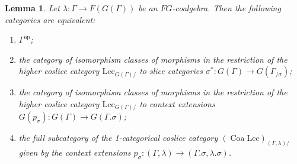 \documentclass[a4paper]{article}
\newtheorem{lemma}[theorem]{Lemma}
\theoremstyle{remark}
\theoremstyle{definition}
\begin{document}
\begin{lemma}
  \label{lem:cats-of-weak-exts}
  Let $\lambda : \Gamma \rightarrow F(G(\Gamma))$ be an $FG$-coalgebra.
  Then the following categories are equivalent:
  \begin{enumerate}
    \item
      \label{itm:locally-discrete-gamma-op}
      $\Gamma^\mathrm{op}$;
    \item
      \label{itm:slice-2-category}
      the category of isomorphism classes of morphisms in the restriction of the higher coslice category $\mathrm{Lcc}_{G(\Gamma) /}$ to slice categories $\sigma^* : G(\Gamma) \rightarrow G(\Gamma_{/ \sigma})$;
    \item
      \label{itm:ext-2-category}
      the category of isomorphism classes of morphisms in the restriction of the higher coslice category $\mathrm{Lcc}_{G(\Gamma) /}$ to context extensions $G(p_\sigma) : G(\Gamma) \rightarrow G(\Gamma.\sigma)$;
    \item
      \label{itm:ext-1-category}
      the full subcategory of the 1-categorical coslice category $(\operatorname{Coa} \mathrm{Lcc})_{(\Gamma, \lambda) /}$ given by the context extensions $p_\sigma : (\Gamma, \lambda) \rightarrow (\Gamma.\sigma, \lambda.\sigma)$.
  \end{enumerate}
\end{lemma}
\end{document}
